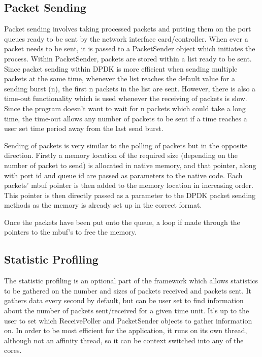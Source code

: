 \documentclass[final_report.tex]{subfiles}
\begin{document}
\subsection{Packet Sending}
Packet sending involves taking processed packets and putting them on the port queues ready to be sent by the network interface card/controller. When ever a packet needs to be sent, it is passed to a PacketSender object which initiates the process. Within PacketSender, packets are stored within a list ready to be sent. Since packet sending within DPDK is more efficient when sending multiple packets at the same time, whenever the list reaches the default value for a sending burst (n), the first n packets in the list are sent. However, there is also a time-out functionality which is used whenever the receiving of packets is slow. Since the program doesn't want to wait for n packets which could take a long time, the time-out allows any number of packets to be sent if a time reaches a user set time period away from the last send burst.

Sending of packets is very similar to the polling of packets  but in the opposite direction. Firstly a memory location of the required size (depending on the number of packet to send) is allocated in native memory, and that pointer, along with port id and queue id are passed as parameters to the native code. Each packets' mbuf pointer is then added to the memory location in increasing order. This pointer is then directly passed as a parameter to the DPDK packet sending methods as the memory is already set up in the correct format.

Once the packets have been put onto the queue, a loop if made through the pointers to the mbuf's to free the memory.

\subsection{Statistic Profiling}
The statistic profiling is an optional part of the framework which allows statistics to be gathered on the number and sizes of packets received and packets sent. It gathers data every second by default, but can be user set to find information about the number of packets sent/received for a given time unit. It's up to the user to set which ReceivePoller and PacketSender objects to gather information on. In order to be most efficient for the application, it runs on its own thread, although not an affinity thread, so it can be context switched into any of the cores.
\end{document}
